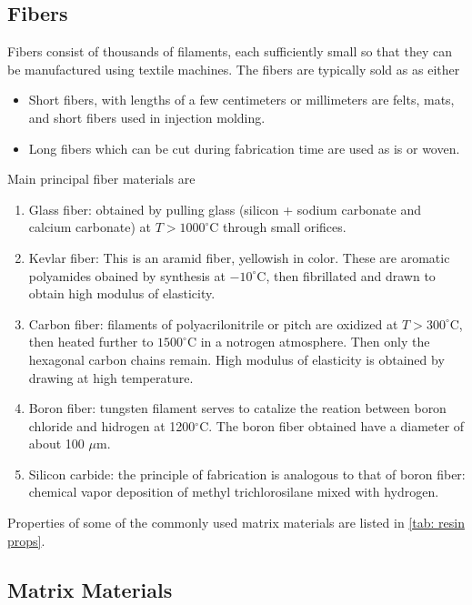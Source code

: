 \documentclass[
10pt,
a4paper,
openany,
svgnames,
]{book}
\begin{document}
\subsection{Fibers}

Fibers consist of thousands of filaments, each sufficiently small so that they can be manufactured using textile machines. The fibers are typically sold as as either

\begin{itemize}
\item Short fibers, with lengths of a few centimeters or millimeters are felts, mats, and short fibers used in injection molding.
\item Long fibers which can be cut during fabrication time are used as is or woven.
\end{itemize}

Main principal fiber materials are

\begin{enumerate}
\item Glass fiber: obtained by pulling glass (silicon + sodium carbonate and calcium carbonate) at $T > 1000^{\circ}$C through small orifices.
\item Kevlar fiber: This is an aramid fiber, yellowish in color. These are aromatic polyamides obained by synthesis at $-10^{\circ}$C, then fibrillated and drawn to obtain high modulus of elasticity.
\item Carbon fiber: filaments of polyacrilonitrile or pitch are oxidized at $T > 300^{\circ}$C, then heated further to $1500^{\circ}$C in a notrogen atmosphere. Then only the hexagonal carbon chains remain. High modulus of elasticity is obtained by drawing at high temperature.
\item Boron fiber: tungsten filament serves to catalize the reation between boron chloride and hidrogen at 1200$^{\circ}$C. The boron fiber obtained have a diameter of about 100 $\mu$m.
\item Silicon carbide: the principle of fabrication is analogous to that of boron fiber: chemical vapor deposition of methyl trichlorosilane mixed with hydrogen.
\end{enumerate}

Properties of some of the commonly used matrix materials are listed in \cref{tab: resin props}.

\subsection{Matrix Materials}
\end{document}
